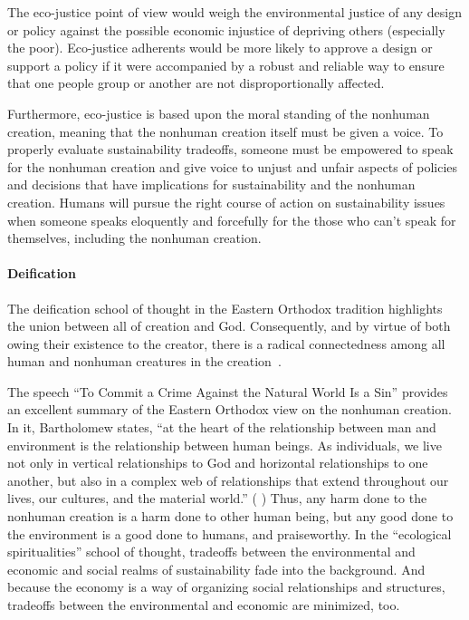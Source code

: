 \documentclass[12pt]{article}
\begin{document}
The eco-justice point of view
would weigh the environmental justice of any design or policy
against the possible economic injustice of depriving others
(especially the poor). 
Eco-justice adherents would be more likely to approve a design or support a policy if it
were accompanied by a robust and reliable way to ensure that one people group or another
are not disproportionally affected.

Furthermore, eco-justice is based upon the moral standing of the nonhuman creation,
meaning that the nonhuman creation itself must be given a voice.
To properly evaluate sustainability tradeoffs,
someone must be empowered to speak for the nonhuman creation and
give voice to unjust and unfair aspects of policies and decisions
that have implications for sustainability and the nonhuman creation.
Humans will pursue the right course of action on sustainability issues
when someone speaks eloquently and forcefully for the
those who can't speak for themselves, including the nonhuman creation.


\paragraph{Deification} 
\label{sec:deification}

The deification school of thought in the Eastern Orthodox tradition
highlights the union between all of creation and God.
Consequently, and by virtue of both owing their existence to the creator,
there is a radical connectedness among all human and nonhuman creatures 
in the creation~\autocite[93]{Jenkins:2008}.

The speech ``To Commit a Crime Against the Natural World Is a Sin'' 
\autocite[133-136]{Bartholomew-I-of-Constantinople:2011aa}
provides an excellent summary of the Eastern Orthodox view
on the nonhuman creation.
In it, Bartholomew states,
``at the heart of the relationship between man and environment 
is the relationship between human beings.
As individuals, we live not only in vertical relationships to God 
and horizontal relationships to one another, but 
also in a complex web of relationships that extend throughout
our lives, our cultures, and the material world.''
(\textcite{Bartholomew-I-of-Constantinople:2011aa} 
\textcite[133--134]{Bartholomew-I-of-Constantinople:2011aa})
Thus, any harm done to the nonhuman creation is a harm done to other human being, but
any good done to the environment is a good done to humans, 
and praiseworthy. 
In the ``ecological spiritualities'' school of thought, 
tradeoffs between the environmental and economic and social realms of sustainability
fade into the background. 
And because the economy is a way of organizing social relationships and structures,
tradeoffs between the environmental and economic are minimized, too.
\end{document}
